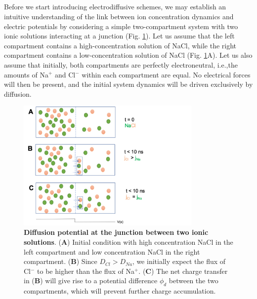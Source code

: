 \subsection{}
\label{sec:Schemes:LJpot}
Before we start introducing electrodiffusive schemes, we may establish an intuitive understanding of the link between ion concentration dynamics and electric potentials by considering a simple two-compartment system with two ionic solutions interacting at a junction  (Fig. \ref{Schemes:fig:diffpot}). Let us assume that the left compartment contains a high-concentration solution of NaCl, while the right compartment contains a low-concentration solution of NaCl (Fig. \ref{Schemes:fig:diffpot}A). Let us also assume that initially, both compartments are perfectly electroneutral, i.e.,the amounts of Na$^+$ and Cl$^-$ within each compartment are equal. No  electrical forces will then be present, and the initial system dynamics will be driven exclusively by diffusion.

\begin{figure}[!ht]
\begin{center}
\includegraphics[width=0.8\textwidth]{Figures/Schemes/Diffusionpot.png}
\end{center}
\caption{\textbf{Diffusion potential at the junction between two ionic solutions}. ({\bf A}) Initial condition with high concentration NaCl in the left compartment and low concentration NaCl in the right compartment. ({\bf B}) Since $D_{Cl} > D_{Na}$, we initially expect the flux of Cl$^-$ to be higher than the flux of Na$^+$. ({\bf C}) The net charge transfer in ({\bf B}) will give rise to a potential difference $\phi_d$ between the two compartments, which will prevent further charge accumulation. }
\label{Schemes:fig:diffpot}
\end{figure}

